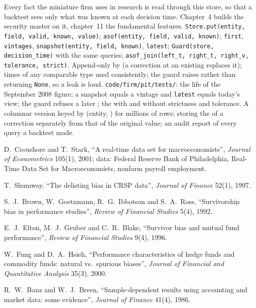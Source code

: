 \begin{build}
 Every fact the miniature firm uses in research is read through this store, so that a backtest sees only what
was known at each decision time. Chapter~4 builds the security master on it, chapter~11 the fundamental features.
 \texttt{Store.put(entity, field, valid, known, value)}; \texttt{asof(entity, field, valid, known)};
\texttt{first}, \texttt{vintages}, \texttt{snapshot(entity, field, known)}, \texttt{latest}; \texttt{Guard(store,
decision\_time)} with the same queries; \texttt{asof\_join(left\_t, right\_t, right\_v, tolerance, strict)}.
 Append-only by  (a correction at an existing  replaces it); times of any comparable
type used consistently; the guard raises rather than returning \texttt{None}, so a leak is loud.
 \texttt{code/firm/pit/tests/}: the life of the September 2008 figure; a snapshot equals a vintage and
\texttt{latest} equals today's view; the guard refuses a later ; the  with and without strictness and
tolerance.
 A columnar version keyed by (entity, ) for millions of rows; storing the  of a
correction separately from that of the original value; an audit report of every query a backtest made.
\end{build}

\begin{omsources}
\item D.~Croushore and T.~Stark, ``A real-time data set for macroeconomists'', \emph{Journal of Econometrics} 105(1), 2001;
data: Federal Reserve Bank of Philadelphia, Real-Time Data Set for Macroeconomists, nonfarm payroll employment.
\item T.~Shumway, ``The delisting bias in CRSP data'', \emph{Journal of Finance} 52(1), 1997.
\item S.~J.~Brown, W.~Goetzmann, R.~G.~Ibbotson and S.~A.~Ross, ``Survivorship bias in performance studies'', \emph{Review of
Financial Studies} 5(4), 1992.
\item E.~J.~Elton, M.~J.~Gruber and C.~R.~Blake, ``Survivor bias and mutual fund performance'', \emph{Review of Financial Studies}
9(4), 1996.
\item W.~Fung and D.~A.~Hsieh, ``Performance characteristics of hedge funds and commodity funds: natural vs.\ spurious biases'',
\emph{Journal of Financial and Quantitative Analysis} 35(3), 2000.
\item R.~W.~Banz and W.~J.~Breen, ``Sample-dependent results using accounting and market data: some evidence'', \emph{Journal of
Finance} 41(4), 1986.
\end{omsources}

